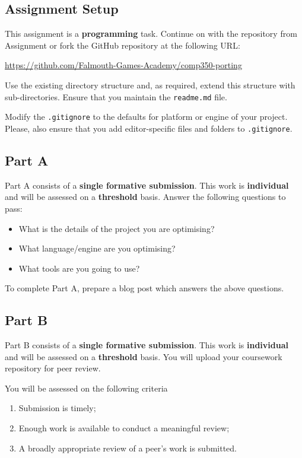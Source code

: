 \documentclass{../../fal_assignment}
\begin{document}
\subsection*{Assignment Setup}

This assignment is a \textbf{programming} task. Continue on with the repository from Assignment or fork the GitHub repository at the following URL:

\indent \url{https://github.com/Falmouth-Games-Academy/comp350-porting}

Use the existing directory structure and, as required, extend this structure with sub-directories.
Ensure that you maintain the \texttt{readme.md} file.

Modify the \texttt{.gitignore} to the defaults for platform or engine of your project.
Please, also ensure that you add editor-specific files and folders to \texttt{.gitignore}. 

\subsection*{Part A}

Part A consists of a \textbf{single formative submission}. This work is \textbf{individual} and will be assessed on a \textbf{threshold} basis. Answer the following questions to pass:

\begin{itemize}
	\item What is the details of the project you are optimising?
	\item What language/engine are you optimising?
	\item What tools are you going to use?
\end{itemize}

To complete Part A, prepare a blog post which answers the above questions.

\subsection*{Part B}

Part B consists of a \textbf{single formative submission}. This work is \textbf{individual} and will be assessed on a \textbf{threshold} basis. You will upload your coursework repository for peer review.

You will be assessed on the following criteria 

\begin{enumerate}[label=(\alph*)]
	\item Submission is timely;
	\item Enough work is available to conduct a meaningful review;
	\item A broadly appropriate review of a peer's work is submitted.
\end{enumerate}
\end{document}
